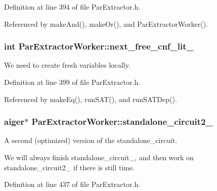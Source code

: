 Definition at line 394 of file Par\-Extractor.\-h.



Referenced by make\-And(), make\-Or(), and Par\-Extractor\-Worker().

\hypertarget{classParExtractorWorker_a71f5c8e875908f12f60964ec17e2b203}{
\subsubsection[{next\-\_\-free\-\_\-cnf\-\_\-lit\-\_\-}]{\setlength{\rightskip}{0pt plus 5cm}int Par\-Extractor\-Worker\-::next\-\_\-free\-\_\-cnf\-\_\-lit\-\_\-\hspace{0.3cm}{\ttfamily [protected]}}}\label{classParExtractorWorker_a71f5c8e875908f12f60964ec17e2b203}


We need to create fresh variables locally. 



Definition at line 399 of file Par\-Extractor.\-h.



Referenced by make\-Eq(), run\-S\-A\-T(), and run\-S\-A\-T\-Dep().

\hypertarget{classParExtractorWorker_a304c66039a45652e273876f7c6da8bcf}{
\subsubsection[{standalone\-\_\-circuit2\-\_\-}]{\setlength{\rightskip}{0pt plus 5cm}aiger$\ast$ Par\-Extractor\-Worker\-::standalone\-\_\-circuit2\-\_\-\hspace{0.3cm}{\ttfamily [protected]}}}\label{classParExtractorWorker_a304c66039a45652e273876f7c6da8bcf}


A second (optimized) version of the standalone\-\_\-circuit. 

We will always finish standalone\-\_\-circuit\-\_\-, and then work on standalone\-\_\-circuit2\-\_\- if there is still time. 

Definition at line 437 of file Par\-Extractor.\-h.



